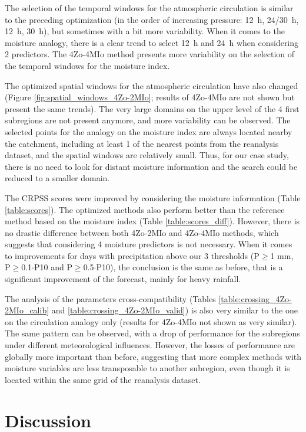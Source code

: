 \documentclass[5p]{elsarticle}
\begin{document}
The selection of the temporal windows for the atmospheric circulation is similar to the preceding optimization (in the order of increasing pressure: 12~h, 24/30~h, 12~h, 30~h), but sometimes with a bit more variability. When it comes to the moisture analogy, there is a clear trend to select 12~h and 24~h when considering 2 predictors. The 4Zo-4MIo method presents more variability on the selection of the temporal windows for the moisture index.

The optimized spatial windows for the atmospheric circulation have also changed (Figure \ref{fig:spatial_windows_4Zo-2MIo}; results of 4Zo-4MIo are not shown but present the same trends). The very large domains on the upper level of the 4 first subregions are not present anymore, and more variability can be observed. The selected points for the analogy on the moisture index are always located nearby the catchment, including at least 1 of the nearest points from the reanalysis dataset, and the spatial windows are relatively small. Thus, for our case study, there is no need to look for distant moisture information and the search could be reduced to a smaller domain. 

The CRPSS scores were improved by considering the moisture information (Table \ref{table:scores}). The optimized methods also perform better than the reference method based on the moisture index (Table \ref{table:scores_diff}). However, there is no drastic difference between both 4Zo-2MIo and 4Zo-4MIo methods, which suggests that considering 4 moisture predictors is not necessary. When it comes to improvements for days with precipitation above our 3 thresholds (P\(\geq\)1 mm, P\(\geq\)0.1\(\cdot\)P10 and P\(\geq\)0.5\(\cdot\)P10), the conclusion is the same as before, that is a significant improvement of the forecast, mainly for heavy rainfall.

The analysis of the parameters cross-compatibility (Tables \ref{table:crossing_4Zo-2MIo_calib} and \ref{table:crossing_4Zo-2MIo_valid}) is also very similar to the one on the circulation analogy only (results for 4Zo-4MIo not shown as very similar). The same pattern can be observed, with a drop of performance for the subregions under different meteorological influences. However, the losses of performance are globally more important than before, suggesting that more complex methods with moisture variables are less transposable to another subregion, even though it is located within the same grid of the reanalysis dataset.


\section{Discussion}
\label{sec:discussion}
\end{document}

